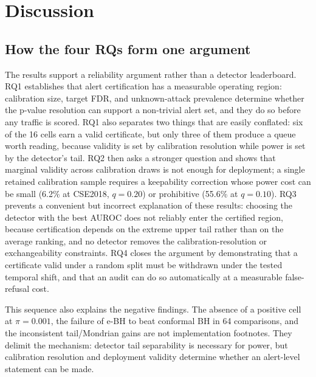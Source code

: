 \documentclass[a4paper,fleqn]{cas-dc}
\begin{document}

\section{Discussion}
\label{sec:discussion}

\subsection{How the four RQs form one argument}
The results support a reliability argument rather than a detector leaderboard. RQ1 establishes that alert certification has a measurable operating region: calibration size, target FDR, and unknown-attack prevalence determine whether the p-value resolution can support a non-trivial alert set, and they do so before any traffic is scored. RQ1 also separates two things that are easily conflated: six of the 16 cells earn a valid certificate, but only three of them produce a queue worth reading, because validity is set by calibration resolution while power is set by the detector's tail. RQ2 then asks a stronger question and shows that marginal validity across calibration draws is not enough for deployment; a single retained calibration sample requires a keepability correction whose power cost can be small (6.2\% at CSE2018, $q=0.20$) or prohibitive (55.6\% at $q=0.10$). RQ3 prevents a convenient but incorrect explanation of these results: choosing the detector with the best AUROC does not reliably enter the certified region, because certification depends on the extreme upper tail rather than on the average ranking, and no detector removes the calibration-resolution or exchangeability constraints. RQ4 closes the argument by demonstrating that a certificate valid under a random split must be withdrawn under the tested temporal shift, and that an audit can do so automatically at a measurable false-refusal cost.

This sequence also explains the negative findings. The absence of a positive cell at $\pi=0.001$, the failure of e-BH to beat conformal BH in 64 comparisons, and the inconsistent tail/Mondrian gains are not implementation footnotes. They delimit the mechanism: detector tail separability is necessary for power, but calibration resolution and deployment validity determine whether an alert-level statement can be made.
\end{document}
